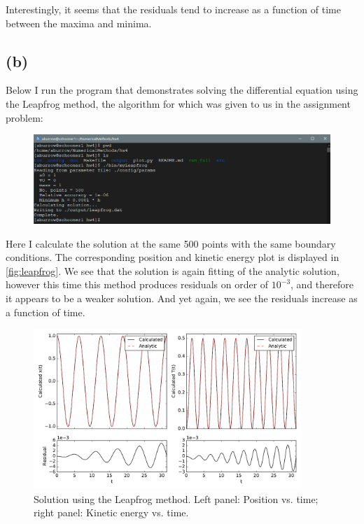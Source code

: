 \documentclass[12pt]{article}
\begin{document}
Interestingly, it seems that the residuals tend to increase as a function of
time between the maxima and minima.

\subsection*{(b)}

Below I run the program that demonstrates solving the differential equation
using the Leapfrog method, the algorithm for which was given to us in the
assignment problem:
\begin{figure}[H]
    \centering
    \includegraphics[width=1\textwidth]{myLeapfrog}
    \label{fig:myLeapfrog}
\end{figure}

Here I calculate the solution at the same 500 points with the same boundary
conditions. The corresponding position and kinetic energy plot is displayed in
\autoref{fig:leapfrog}. We see that the solution is again fitting of the
analytic solution, however this time this method produces residuals on order of
$10^{-3}$, and therefore it appears to be a weaker solution. And yet again, we
see the residuals increase as a function of time.

\begin{figure}[ht]
    \centering
    \includegraphics[width=0.9\textwidth]{leapfrog}
    \caption{Solution using the Leapfrog method. Left panel: Position vs.
             time; right panel: Kinetic energy vs. time.}
    \label{fig:leapfrog}
\end{figure}
\end{document}

